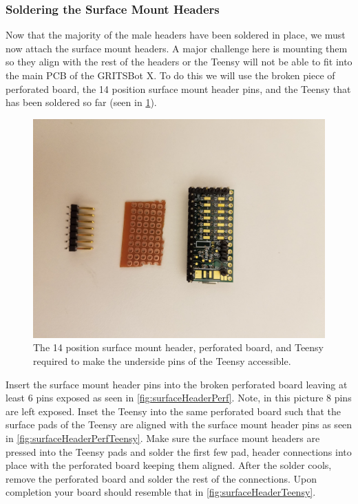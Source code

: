 \subsubsection{Soldering the Surface Mount Headers}
\label{sec:teensySecondSolder}

Now that the majority of the male headers have been soldered in place, we must now attach the surface mount headers. A major challenge here is mounting them so they align with the rest of the headers or the Teensy will not be able to fit into the main PCB of the GRITSBot X. To do this we will use the broken piece of perforated board, the 14 position surface mount header pins, and the Teensy that has been soldered so far (seen in \cref{fig:teensyMaterialsSecondSolder}).

\begin{figure}[h!]
\centering
\includegraphics[trim={15cm 0 0 0},clip=true,width=0.65\columnwidth, keepaspectratio,angle=180]{./figs/20180911_105530.jpg}
\caption{The 14 position surface mount header, perforated board, and Teensy required to make the underside pins of the Teensy accessible.}
\label{fig:teensyMaterialsSecondSolder}
\end{figure}

Insert the surface mount header pins into the broken perforated board leaving at least 6 pins exposed as seen in \cref{fig:surfaceHeaderPerf}. Note, in this picture 8 pins are left exposed. Inset the Teensy into the same perforated board such that the surface pads of the Teensy are aligned with the surface mount header pins as seen in \cref{fig:surfaceHeaderPerfTeensy}. Make sure the surface mount headers are pressed into the Teensy pads and solder the first few pad, header connections into place with the perforated board keeping them aligned. After the solder cools, remove the perforated board and solder the rest of the connections. Upon completion your board should resemble that in \cref{fig:surfaceHeaderTeensy}.

